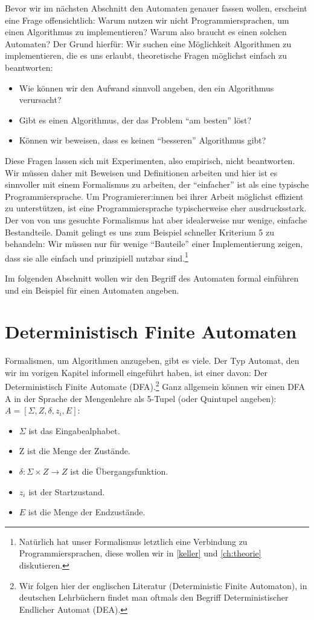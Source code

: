 Bevor wir im nächsten Abschnitt den Automaten genauer fassen wollen,
erscheint eine Frage offensichtlich:
Warum nutzen wir nicht Programmiersprachen, um einen Algorithmus zu implementieren?
Warum also braucht es einen solchen Automaten?
Der Grund hierfür:
Wir suchen eine Möglichkeit Algorithmen zu implementieren,
die es uns erlaubt,
theoretische Fragen möglichst einfach zu beantworten:
\begin{itemize}
    \item Wie können wir den Aufwand sinnvoll angeben, den ein Algorithmus verursacht?
    \item Gibt es einen Algorithmus, der das Problem ``am besten'' löst?
    \item Können wir beweisen, dass es keinen ``besseren'' Algorithmus gibt?
\end{itemize}
Diese Fragen lassen sich mit Experimenten, also empirisch, nicht beantworten.
Wir müssen daher mit Beweisen und Definitionen arbeiten
und hier ist es sinnvoller mit einem Formalismus zu arbeiten,
der ``einfacher'' ist als eine typische Programmiersprache.
Um Programierer:innen bei ihrer Arbeit möglichst effizient zu unterstützen,
ist eine Programmiersprache typischerweise eher ausdrucksstark.
Der von von uns gesuchte Formalismus hat aber idealerweise nur wenige, einfache Bestandteile.
Damit gelingt es uns zum Beispiel schneller Kriterium 5 zu behandeln:
Wir müssen nur für wenige ``Bauteile'' einer Implementierung zeigen,
dass sie alle einfach und prinzipiell nutzbar sind.\footnote{
    Natürlich hat unser Formalismus letztlich eine Verbindung zu Programmiersprachen,
    diese wollen wir in \autoref{keller} und \autoref{ch:theorie} diskutieren.
}

Im folgenden Abschnitt wollen wir den Begriff des Automaten formal einführen
und ein Beispiel für einen Automaten angeben. 

\section{Deterministisch Finite Automaten}

Formalismen, um Algorithmen anzugeben, gibt es viele.
Der Typ Automat, den wir im vorigen Kapitel informell eingeführt haben,
ist einer davon:
Der Deterministisch Finite Automate (DFA).\footnote{
    Wir folgen hier der englischen Literatur (Deterministic Finite Automaton),
    in deutschen Lehrbüchern findet man oftmals den Begriff
    Deterministischer Endlicher Automat (DEA).
}
Ganz allgemein können wir einen DFA A in der Sprache der Mengenlehre
als 5-Tupel (oder Quintupel angeben): $A = [\Sigma, Z, \delta, z_i, E]$:
\begin{itemize}
    \item $\Sigma$ ist das Eingabealphabet.
    \item Z ist die Menge der Zustände.
    \item $\delta: \Sigma \times Z \rightarrow Z$ ist die Übergangsfunktion.
    \item $z_i$ ist der Startzustand.
    \item $E$ ist die Menge der Endzustände.
\end{itemize}

